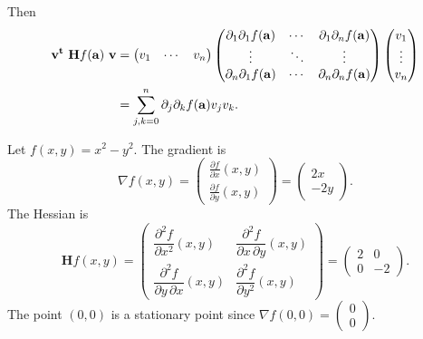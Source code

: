 Then
\[
    \begin{aligned}
        \mathbf{v}^{\mathbf{t}} \ \mathbf{H} f (\mathbf{a}) \ \mathbf{v}
         & =
        \begin{pmatrix}
            v_1 & \cdots & v_n
        \end{pmatrix}
        \begin{pmatrix}
            \partial_{1}\partial_{1}f(\mathbf{a}) & \cdots &
            \partial_{1}\partial_{n}f(\mathbf{a})                   \\
            \vdots                         & \ddots & \vdots \\
            \partial_{n}\partial_{1}f(\mathbf{a}) & \cdots &
            \partial_{n}\partial_{n}f(\mathbf{a})
        \end{pmatrix}
        \begin{pmatrix}
            v_1 \\ \vdots \\v_n
        \end{pmatrix} \\
         & = \sum_{j,k=0}^{n}
        \partial_{j}\partial_{k}f(\mathbf{a})
        v_j v_k.
    \end{aligned}
\]


\begin{example}
    Let \(f(x,y)=x^2-y^2\).
    The gradient is
    \[\nabla f(x,y) =\begin{pmatrix}
            \frac{\partial f}{\partial x} (x,y) \\[2.2ex]
            \frac{\partial f}{\partial y} (x,y)
        \end{pmatrix} =   \begin{pmatrix}
            2x \\-2y
        \end{pmatrix}.
    \]
    The Hessian is
    \[
        \mathbf{H} f (x,y)= \begin{pmatrix}
            \dfrac{\partial^2 f}{\partial x^2} (x,y)
             & \dfrac{\partial^2 f}{\partial x\,\partial y} (x,y)
            \\[2.2ex]
            \dfrac{\partial^2 f}{\partial y\,\partial x} (x,y)
             & \dfrac{\partial^2 f}{\partial y^2}(x,y)
        \end{pmatrix}
        = \begin{pmatrix}
            2
             & 0
            \\[2.2ex]
            0
             & -2
        \end{pmatrix}.
    \]
    The point \((0,0)\) is a stationary point since \(\nabla f(0,0) =\left(\begin{smallmatrix}
            0\\0
        \end{smallmatrix}\right) \).
\end{example}





